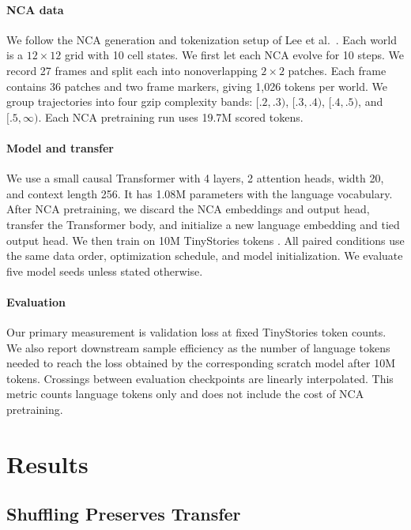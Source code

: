 \documentclass[10pt]{article}
\begin{document}
\paragraph{NCA data}
We follow the NCA generation and tokenization setup of Lee et al.\ \citep{lee2026nca}. Each world is a $12{\times}12$ grid with 10 cell states. We first let each NCA evolve for 10 steps. We record 27 frames and split each into nonoverlapping $2\times2$ patches. Each frame contains 36 patches and two frame markers, giving 1,026 tokens per world. We group trajectories into four gzip complexity bands: $[.2,.3)$, $[.3,.4)$, $[.4,.5)$, and $[.5,\infty)$. Each NCA pretraining run uses 19.7M scored tokens.

\paragraph{Model and transfer}
We use a small causal Transformer \citep{vaswani2017attention} with 4 layers, 2 attention heads, width 20, and context length 256. It has 1.08M parameters with the language vocabulary. After NCA pretraining, we discard the NCA embeddings and output head, transfer the Transformer body, and initialize a new language embedding and tied output head. We then train on 10M TinyStories tokens \citep{eldan2023tinystories}. All paired conditions use the same data order, optimization schedule, and model initialization. We evaluate five model seeds unless stated otherwise.

\paragraph{Evaluation}
Our primary measurement is validation loss at fixed TinyStories token counts. We also report downstream sample efficiency as the number of language tokens needed to reach the loss obtained by the corresponding scratch model after 10M tokens. Crossings between evaluation checkpoints are linearly interpolated. This metric counts language tokens only and does not include the cost of NCA pretraining.


\section{Results}

\subsection{Shuffling Preserves Transfer}
\end{document}

